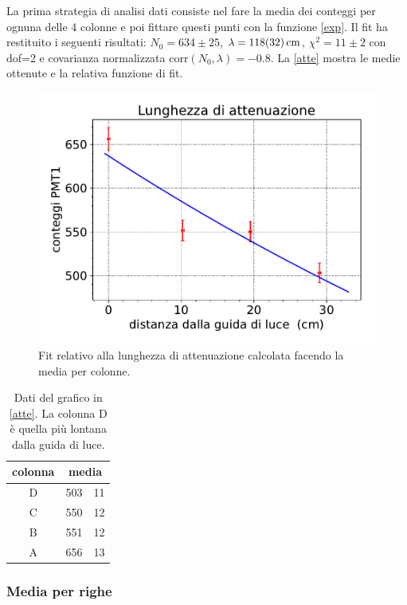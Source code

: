 La prima strategia di analisi dati consiste nel fare la media dei conteggi per ognuna delle 4 colonne e poi fittare questi punti con la funzione \eqref{exp}.
Il fit ha restituito i seguenti risultati: $N_0=634\pm25$,  $\lambda=\SI{118\pm32}{cm}$, $\chi^2=11\pm2$ con dof=2 e covarianza normalizzata corr$(N_0,\lambda)=-0.8$. 
La \autoref{atte} mostra le medie ottenute e la relativa funzione di fit.
\begin{figure}[h]
\centering
\includegraphics[width=8 cm]{atte}
\caption{Fit relativo alla lunghezza di attenuazione calcolata facendo la media per colonne.}
\label{atte}
\end{figure}

\begin{table}[h]
\centering
\begin{tabular}{| c | r @{$\pm$} l |}
\hline
colonna & \multicolumn{2}{c|}{media} \\
\hline
D & 503&11 \\
C & 550&12 \\
B & 551&12 \\
A & 656&13 \\
\hline
\end{tabular}
\caption{Dati del grafico in \autoref{atte}. La colonna D è quella più lontana dalla guida di luce.}
\end{table}

\subsubsection{Media per righe}

